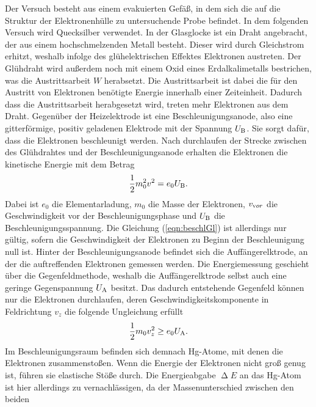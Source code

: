 \noindent
Der Versuch besteht aus einem evakuierten Gefäß, in dem sich die auf die Struktur der Elektronenhülle zu untersuchende Probe befindet. In dem folgenden Versuch wird Quecksilber verwendet.
In der Glasglocke ist ein Draht angebracht, der aus einem hochschmelzenden Metall besteht. Dieser wird durch Gleichstrom erhitzt, weshalb infolge des glühelektrischen Effektes Elektronen austreten.
Der Glühdraht wird außerdem noch mit einem Oxid eines Erdalkalimetalls bestrichen, was die Austrittsarbeit $W$ herabsetzt. Die Austrittsarbeit ist dabei die für den Austritt von Elektronen benötigte Energie innerhalb einer Zeiteinheit.
Dadurch dass die Austrittsarbeit herabgesetzt wird, treten mehr Elektronen aus dem Draht.
Gegenüber der Heizelektrode ist eine Beschleunigungsanode, also eine gitterförmige, positiv geladenen Elektrode mit der Spannung $U_{\text B}$. Sie sorgt dafür, dass die Elektronen beschleunigt werden. Nach durchlaufen der Strecke zwischen des Glühdrahtes und der Beschleunigungsanode
erhalten die Elektronen die kinetische Energie mit dem Betrag
\begin{align}
    \frac 12 m_0^2 v^2 = e_0 U_{\text B}.
    \label{eqn:beschlGl}
\end{align}
Dabei ist $e_0$ die Elementarladung, $m_0$ die Masse der Elektronen, $v_{\text vor}$ 
die Geschwindigkeit vor der Beschleunigungsphase und $U_{\text B}$ die Beschleunigungsspannung.
Die Gleichung (\ref{eqn:beschlGl}) ist allerdings nur gültig, sofern die Geschwindigkeit der Elektronen zu Beginn der Beschleunigung null ist.
Hinter der Beschleunigungsanode befindet sich die Auffängerelktrode, an der die auftreffenden Elektronen gemessen werden. Die Energiemessung geschieht über die Gegenfeldmethode, weshalb die Auffängerelktrode selbst auch eine geringe Gegenspannung $U_{\text A}$ besitzt.
Das dadurch entstehende Gegenfeld können nur die Elektronen durchlaufen, deren Geschwindigkeitskomponente in Feldrichtung $v_z$ die folgende Ungleichung erfüllt
\begin{align}
    \label{eqn:gegnFeldV}
    \frac 12 m_0 v_z^2 \geq e_0 U_{\text A}.
\end{align}
Im Beschleunigungsraum befinden sich demnach Hg-Atome, mit denen die Elektronen zusammenstoßen. Wenn die Energie der Elektronen nicht groß genug ist, führen sie elastische Stöße durch. Die Energieabgabe $\upDelta E$ an das Hg-Atom ist hier allerdings zu vernachlässigen, da der Massenunterschied zwischen den beiden
